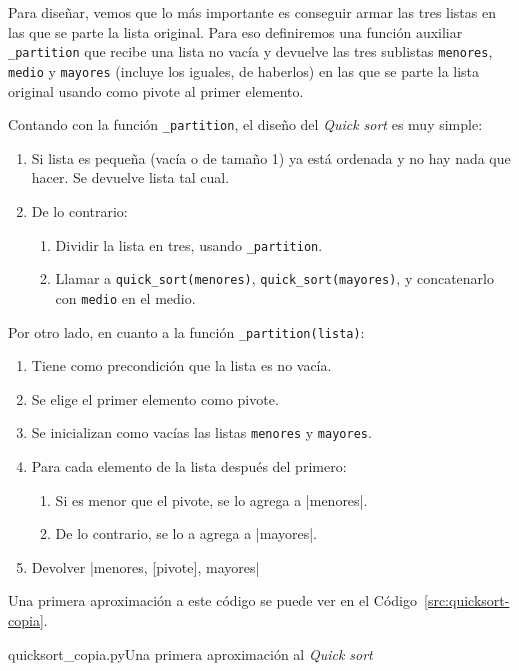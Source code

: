 Para diseñar, vemos que lo más importante es conseguir armar las tres
listas en las que se parte la lista original. Para eso definiremos una
función auxiliar \lstinline!_partition! que recibe una lista no vacía y
devuelve las tres sublistas \lstinline!menores!, \lstinline!medio! y
\lstinline!mayores!  (incluye los iguales, de haberlos) en las que se parte
la lista original usando como pivote al primer elemento.

Contando con la función \lstinline!_partition!, el diseño del \emph{Quick sort}
es muy simple:

\begin{enumerate}
\item Si lista es pequeña (vacía o de tamaño 1) ya está ordenada y
no hay nada que hacer. Se devuelve lista tal cual.
\item De lo contrario:
\begin{enumerate}
\item Dividir la lista en tres, usando \lstinline!_partition!.
\item Llamar a \lstinline!quick_sort(menores)!,
\lstinline!quick_sort(mayores)!, y concatenarlo con \lstinline!medio! en el
medio.
\end{enumerate}
\end{enumerate}

Por otro lado, en cuanto a la función \lstinline!_partition(lista)!:

\begin{enumerate}
\item Tiene como precondición que la lista es no vacía.
\item Se elige el primer elemento como pivote.
\item Se inicializan como vacías las listas \lstinline!menores! y
\lstinline!mayores!.
\item Para cada elemento de la lista después del primero:
\begin{enumerate}
\item Si es menor que el pivote, se lo agrega a |menores|.
\item De lo contrario, se lo a agrega a |mayores|.
\end{enumerate}
\item Devolver |menores, [pivote], mayores|
\end{enumerate}

Una primera aproximación a este código se puede ver en el
Código~\ref{src:quicksort-copia}.

\begin{codigo}{quicksort\_copia.py}{Una primera aproximación al \emph{Quick sort}}
\label{src:quicksort-copia}

\end{codigo}

